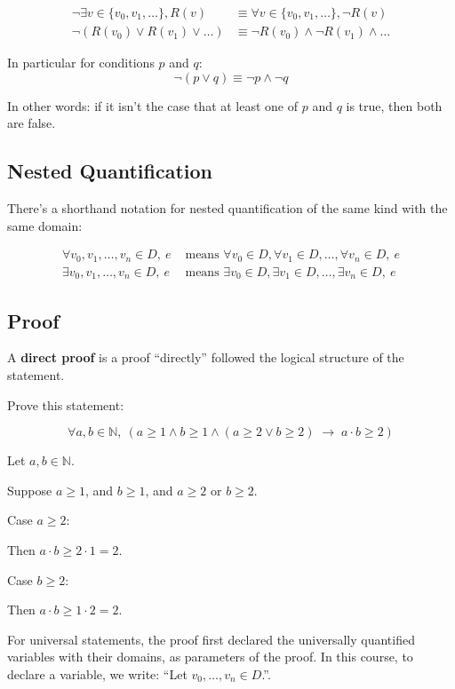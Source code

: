 \documentclass{article}
\begin{document}
\[
\begin{aligned}
    \neg \exists v\in\{v_0,v_1,\dots\},R(v) &\equiv \forall v\in\{v_0,v_1,\dots\},\neg R(v)\\
    \neg (R(v_0)\vee R(v_1)\vee\dots) &\equiv \neg R(v_0)\wedge \neg R(v_1)\wedge\dots
\end{aligned}
\]

In particular for conditions $p$ and $q$:
\[
\neg (p\vee q) \equiv \neg p\wedge \neg q
\]

In other words: if it isn’t the case that at least one of $p$ and $q$ is true, then both are false.


\subsection{Nested Quantification}
There’s a shorthand notation for nested quantification of the same kind with the same domain:

\[
\begin{aligned}
\forall v_0, v_1, \ldots, v_n \in D,\ e &\text{ means } \forall v_0 \in D, \forall v_1 \in D, \ldots, \forall v_n \in D,\ e \\
\exists v_0, v_1, \ldots, v_n \in D,\ e &\text{ means } \exists v_0 \in D, \exists v_1 \in D, \ldots, \exists v_n \in D,\ e
\end{aligned}
\]


\subsection{Proof}
A \textbf{direct proof} is a proof “directly” followed the logical structure of the statement.

Prove this statement:

\[
\forall a,b \in \mathbb{N},\ (a \ge 1 \wedge b \ge 1 \wedge (a \ge 2 \vee b \ge 2) 
\;\rightarrow\; a \cdot b \ge 2)
\]

Let $a,b \in \mathbb{N}$. 

Suppose $a \ge 1$, and $b \ge 1$, and $a \ge 2$ or $b \ge 2$. 

Case $a \ge 2$: 

\qquad Then $a \cdot b \ge 2 \cdot 1 = 2$. 

Case $b \ge 2$: 

\qquad Then $a \cdot b \ge 1 \cdot 2 = 2$. 

For universal statements, the proof first declared the universally quantified variables with their domains, as parameters of
the proof. 
In this course, to declare a variable, we write: “Let $v_0,\dots, v_n \in D$.”.
\end{document}

